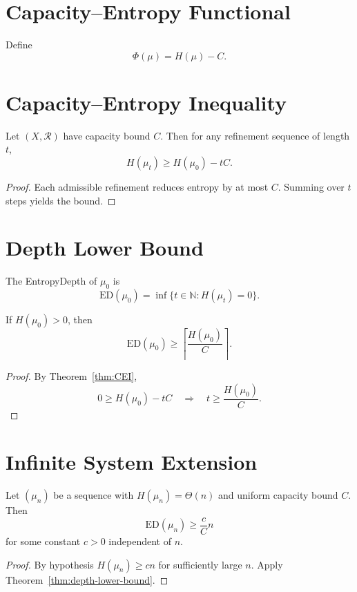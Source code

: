 \section{Capacity–Entropy Functional}

\begin{definition}
Define
\[
\Phi(\mu) = H(\mu) - C.
\]
\end{definition}

\section{Capacity–Entropy Inequality}

\begin{theorem}\label{thm:CEI}
Let $(X,\mathcal{R})$ have capacity bound $C$.  
Then for any refinement sequence of length $t$,
\[
H(\mu_t) \ge H(\mu_0) - tC.
\]
\end{theorem}

\begin{proof}
Each admissible refinement reduces entropy by at most $C$.  
Summing over $t$ steps yields the bound.
\end{proof}

\section{Depth Lower Bound}

\begin{definition}[EntropyDepth]
The EntropyDepth of $\mu_0$ is
\[
\mathrm{ED}(\mu_0)
=
\inf \{ t \in \mathbb{N} : H(\mu_t)=0 \}.
\]
\end{definition}

\begin{theorem}\label{thm:depth-lower-bound}
If $H(\mu_0)>0$, then
\[
\mathrm{ED}(\mu_0)
\ge
\left\lceil \frac{H(\mu_0)}{C} \right\rceil.
\]
\end{theorem}

\begin{proof}
By Theorem~\ref{thm:CEI},
\[
0 \ge H(\mu_0) - tC
\quad \Rightarrow \quad
t \ge \frac{H(\mu_0)}{C}.
\]
\end{proof}

\section{Infinite System Extension}

\begin{theorem}
Let $(\mu_n)$ be a sequence with $H(\mu_n)=\Theta(n)$ and uniform capacity bound $C$.  
Then
\[
\mathrm{ED}(\mu_n)
\ge
\frac{c}{C} n
\]
for some constant $c>0$ independent of $n$.
\end{theorem}

\begin{proof}
By hypothesis $H(\mu_n) \ge c n$ for sufficiently large $n$.  
Apply Theorem~\ref{thm:depth-lower-bound}.
\end{proof}
